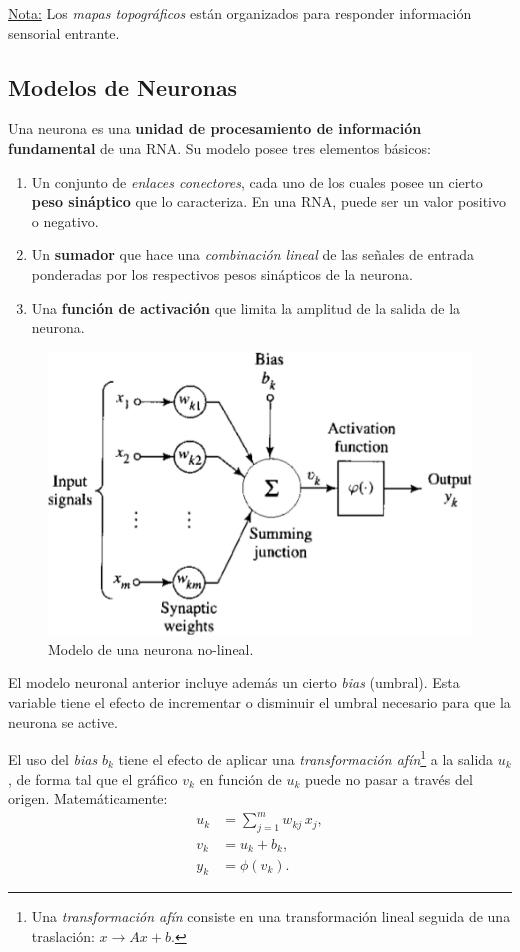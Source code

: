 \documentclass[10pt,a4paper]{article}
\begin{document}
\underline{Nota:} Los \textit{mapas topográficos} están organizados para responder información sensorial entrante.

\subsection{Modelos de Neuronas}

Una neurona es una \textbf{unidad de procesamiento de información fundamental} de una RNA. Su modelo posee tres elementos básicos:
\begin{enumerate}
\item Un conjunto de \textit{enlaces conectores}, cada uno de los cuales posee un cierto \textbf{peso sináptico} que lo caracteriza. En una RNA, puede ser un valor positivo o negativo.
\item Un \textbf{sumador} que hace una \textit{combinación lineal} de las señales de entrada ponderadas por los respectivos pesos sinápticos de la neurona.
\item Una \textbf{función de activación} que limita la amplitud de la salida de la neurona.
\end{enumerate}

\begin{figure}
  \caption{Modelo de una neurona no-lineal.}
  \label{fig:p1_modeloneurona}
  \centering
  \hbox{\includegraphics[width=0.6\textwidth-\fboxrule-\fboxrule]{imgs/p1_modeloneurona.png}}
\end{figure}

El modelo neuronal anterior incluye además un cierto \textit{bias} (umbral). Esta variable tiene el efecto de incrementar o disminuir el umbral necesario para que la neurona se active.

El uso del \textit{bias} $b_k$ tiene el efecto de aplicar una \textit{transformación afín}\footnote{Una \textit{transformación afín} consiste en una transformación lineal seguida de una traslación: $x \rightarrow Ax + b$.} a la salida $u_k$, de forma tal que el gráfico $v_k$ en función de $u_k$ puede no pasar a través del origen. Matemáticamente:
\begin{align*}
u_k &= \sum_{j=1}^m w_{kj} \, x_j, \\
v_k &= u_k + b_k, \\
y_k &= \phi(v_k).
\end{align*}
\end{document}
